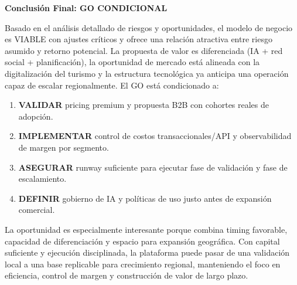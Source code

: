 \documentclass[12pt]{article}
\begin{document}
\textbf{Conclusión Final: GO CONDICIONAL}

Basado en el análisis detallado de riesgos y oportunidades, el modelo de negocio es VIABLE con ajustes críticos y ofrece una relación atractiva entre riesgo asumido y retorno potencial. La propuesta de valor es diferenciada (IA + red social + planificación), la oportunidad de mercado está alineada con la digitalización del turismo y la estructura tecnológica ya anticipa una operación capaz de escalar regionalmente. El GO está condicionado a:

\begin{enumerate}
    \item \textbf{VALIDAR} pricing premium y propuesta B2B con cohortes reales de adopción.
    \item \textbf{IMPLEMENTAR} control de costos transaccionales/API y observabilidad de margen por segmento.
    \item \textbf{ASEGURAR} runway suficiente para ejecutar fase de validación y fase de escalamiento.
    \item \textbf{DEFINIR} gobierno de IA y políticas de uso justo antes de expansión comercial.
\end{enumerate}

La oportunidad es especialmente interesante porque combina timing favorable, capacidad de diferenciación y espacio para expansión geográfica. Con capital suficiente y ejecución disciplinada, la plataforma puede pasar de una validación local a una base replicable para crecimiento regional, manteniendo el foco en eficiencia, control de margen y construcción de valor de largo plazo.
\end{document}
